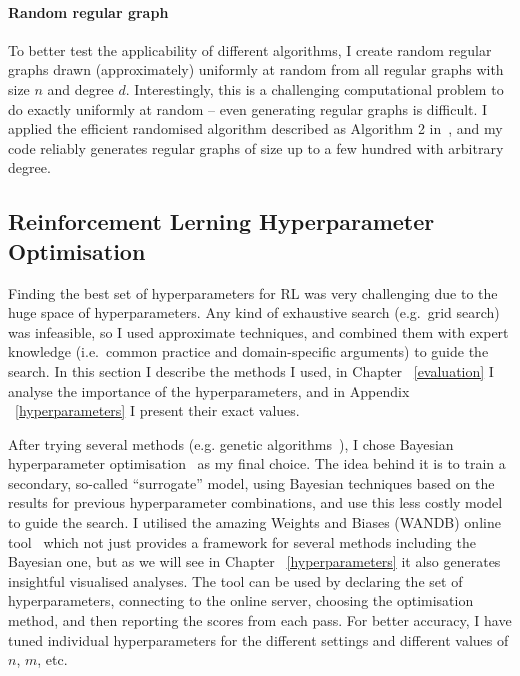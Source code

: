 \paragraph{Random regular graph} To better test the applicability of different algorithms, I create random regular graphs drawn (approximately) uniformly at random from all regular graphs with size $n$ and degree $d$. Interestingly, this is a challenging computational problem to do exactly uniformly at random -- even generating regular graphs is difficult. I applied the efficient randomised algorithm described as Algorithm 2 in~\cite{steger1999randomregulargraphs}, and my code reliably generates regular graphs of size up to a few hundred with arbitrary degree.


\subsection{Reinforcement Lerning Hyperparameter Optimisation}

Finding the best set of hyperparameters for RL was very challenging due to the huge space of hyperparameters. Any kind of exhaustive search (e.g.\ grid search) was infeasible, so I used approximate techniques, and combined them with expert knowledge (i.e.\ common practice and domain-specific arguments) to guide the search.
In this section I describe the methods I used, in Chapter ~\ref{evaluation} I analyse the importance of the hyperparameters, and in Appendix ~\ref{hyperparameters} I present their exact values.


After trying several methods (e.g. genetic algorithms~\cite{wicaksono2018genetichyper}), I chose Bayesian hyperparameter optimisation~\cite{eggensperger2013bayesianhyper} as my final choice. The idea behind it is to train a secondary, so-called ``surrogate'' model, using Bayesian techniques based on the results for previous hyperparameter combinations, and use this less costly model to guide the search. I utilised the amazing Weights and Biases (WANDB) online tool~\cite{biewald2020wandb} which not just provides a framework for several methods including the Bayesian one, but as we will see in Chapter ~\ref{hyperparameters} it also generates insightful visualised analyses. The tool can be used by declaring the set of hyperparameters, connecting to the online server, choosing the optimisation method, and then reporting the scores from each pass. For better accuracy, I have tuned individual hyperparameters for the different settings and different values of $n$, $m$, etc.


